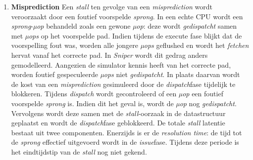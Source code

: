 \documentclass[12pt,a4paper,faculty=ea,language=nl]{ugent-doc}
\begin{document}
\begin{enumerate}
De \textit{µop} die niet \textit{gedispatcht} kan worden, wordt samen met de \textit{stall}-oorzaak in de datastructuur geplaatst, waarna de \textit{dispatch}fase wordt onderbroken.
In tegenstelling tot een \textit{frontend stall} is het eindtijdstip van de \textit{stall} hier niet op voorhand gekend. Het vrijmaken van backend-resources hangt af van de voortgang in de issue- en commitfase, die entries uit de \textit{reservation stations} en de \textit{ROB} verwijderen. Daarom wordt als \textit{next event} een oneindig tijdstip teruggegeven.
De voortgang van de simulatie wordt hierdoor volledig bepaald door events in de issue- en commitfase. De main loop springt telkens naar het eerstvolgende event, waarna opnieuw gecontroleerd wordt of \textit{dispatch} hervat kan worden.
Zolang de backend-resources niet beschikbaar zijn, blijft de \textit{µop} in de datastructuur aanwezig en worden alle cycli toegewezen aan de backend component van de corresponderende \textit{statische instructie}, volgens het basismechanisme.
Zodra een event in de backend voldoende resources vrijmaakt, kan de \textit{µop} alsnog \textit{gedispatcht} worden. Op dat moment wordt deze uit de datastructuur verwijderd en wordt de \textit{dispatch}fase hervat.
Op deze manier wordt de volledige \textit{stall} latentie correct en volledig geattribueerd.
    \item{\textbf{Misprediction}} \label{subparagraph: mispredicted} Een \textit{stall} ten gevolge van een \textit{misprediction} wordt veroorzaakt door een foutief voorspelde \textit{sprong}. In een echte CPU wordt een \textit{sprong}-\textit{µop} behandeld zoals een gewone \textit{µop}: deze wordt \textit{gedispatcht} samen met \textit{µops} op het voorspelde pad. Indien tijdens de execute fase blijkt dat de voorspelling fout was, worden alle jongere \textit{µops} geflushed en wordt het \textit{fetchen} hervat vanaf het correcte pad.
In \textit{Sniper} wordt dit gedrag anders gemodelleerd. Aangezien de simulator kennis heeft van het correcte pad, worden foutief gespeculeerde \textit{µops} niet \textit{gedispatcht}. In plaats daarvan wordt de kost van een \textit{misprediction} gesimuleerd door de \textit{dispatch}fase tijdelijk te blokkeren.
Tijdens \textit{dispatch} wordt gecontroleerd of een \textit{µop} een foutief voorspelde \textit{sprong} is. Indien dit het geval is, wordt de \textit{µop} nog \textit{gedispatcht}. Vervolgens wordt deze samen met de \textit{stall}-oorzaak in de datastructuur geplaatst en wordt de \textit{dispatch}fase geblokkeerd.
De totale \textit{stall} latentie bestaat uit twee componenten. Enerzijds is er de \textit{resolution time}: de tijd tot de \textit{sprong} effectief uitgevoerd wordt in de \textit{issue}fase. Tijdens deze periode is het eindtijdstip van de \textit{stall} nog niet gekend.

\end{enumerate}
\end{document}
